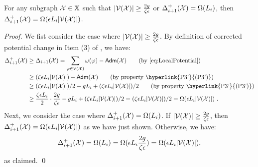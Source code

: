 \begin{lemma}\label{lm:manynodes} For any subgraph $\mathcal{X} \in \mathbb{X}$ such that $|\mathcal{V}(\mathcal{X})|\geq \frac{2g}{\zeta\epsilon}$ or $\Delta^+_{i+1}(\mathcal{X}) = \Omega(L_i)$, then $\Delta^+_{i+1}(\mathcal{X}) = \Omega(\epsilon L_i |\mathcal{V}(\mathcal{X})|)$.
\end{lemma}
\begin{proof} We fist consider the case where $|\mathcal{V}(\mathcal{X})|\geq \frac{2g}{\zeta\epsilon}$.	By definition of corrected potential change in Item (3) of , we have:
	\begin{equation*}
		\begin{split}
			\Delta^+_{i+1}(\mx) &\geq 	\Delta_{i+1}(\mx) = \sum_{\varphi \in \mv(\mx)}\omega(\varphi) -  \adm(\mx) \qquad \mbox{(by \Cref{eq:LocalPotential})} \\
			&\geq (\zeta \eps L_i |\mv(\mx)|)  - \adm(\mx) \qquad \mbox{(by  property \hyperlink{P3'}{(P3')})} \\
			&\geq  (\zeta \eps L_i |\mv(\mx)|)/2   - gL_i + (\zeta \eps L_i |\mv(\mx)|)/2   \qquad \mbox{(by  property \hyperlink{P3'}{(P3')})} \\
			&\geq \frac{\zeta \eps L_i}{2}\cdot \frac{2g}{\zeta \eps }  - gL_i + (\zeta \eps L_i |\mv(\mx)|)/2  = (\zeta \eps L_i |\mv(\mx)|)/2  = \Omega(\eps L_i |\mv(\mx)|)~.
		  	\end{split}
	\end{equation*}
Next, we consider the case where $\Delta^+_{i+1}(\mathcal{X}) = \Omega(L_i)$. If $|\mathcal{V}(\mathcal{X})|\geq \frac{2g}{\zeta \epsilon}$, then  $\Delta^+_{i+1}(\mathcal{X}) = \Omega(\epsilon L_i |\mathcal{V}(\mathcal{X})|)$ as we have just shown. Otherwise, we have:
\begin{equation*}
	\Delta^+_{i+1}(\mathcal{X}) = \Omega(L_i) = \Omega(\epsilon L_i \frac{2g}{\zeta \epsilon}) = \Omega(\epsilon L_i |\mathcal{V}(\mathcal{X})|),
\end{equation*}
as claimed.	\qed
\end{proof}


